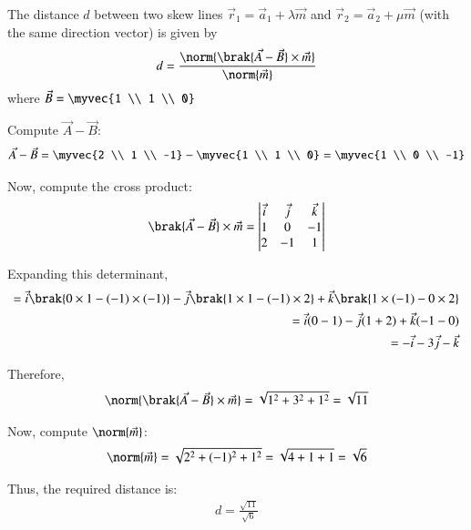 \documentclass[journal]{IEEEtran}
\begin{document}
The distance $d$ between two skew lines $\vec{r}_1 = \vec{a}_1 + \lambda \vec{m}$ and $\vec{r}_2 = \vec{a}_2 + \mu \vec{m}$ (with the same direction vector) is given by
\begin{align}
d = \frac{\norm{\brak{\vec{A} - \vec{B}} \times \vec{m}}}{\norm{\vec{m}}}
\end{align}
where $\vec{B} = \myvec{1 \\ 1 \\ 0}$

Compute $\vec{A} - \vec{B}$:
\begin{align}
\vec{A} - \vec{B} = \myvec{2 \\ 1 \\ -1} - \myvec{1 \\ 1 \\ 0} = \myvec{1 \\ 0 \\ -1}
\end{align}

Now, compute the cross product:
\begin{align}
\brak{\vec{A} - \vec{B}} \times \vec{m} 
= 
\begin{vmatrix}
\vec{i} & \vec{j} & \vec{k} \\
1 & 0 & -1 \\
2 & -1 & 1 \\
\end{vmatrix}
\end{align}

Expanding this determinant,
\begin{align}
= \vec{i} \brak{0 \times 1 - (-1) \times (-1)} - \vec{j} \brak{1 \times 1 - (-1) \times 2} + \vec{k} \brak{1 \times (-1) - 0 \times 2} \\
= \vec{i}(0-1) - \vec{j}(1+2) + \vec{k}(-1-0) \\
= -\vec{i} - 3\vec{j} - \vec{k}
\end{align}

Therefore,
\begin{align}
\norm{\brak{\vec{A} - \vec{B}} \times \vec{m}} = \sqrt{1^2 + 3^2 + 1^2} = \sqrt{11}
\end{align}

Now, compute $\norm{\vec{m}}$:
\begin{align}
\norm{\vec{m}} = \sqrt{2^2 + (-1)^2 + 1^2} = \sqrt{4 + 1 + 1} = \sqrt{6}
\end{align}

Thus, the required distance is:
\begin{align}
d = \frac{\sqrt{11}}{\sqrt{6}}
\end{align}
\end{document}
